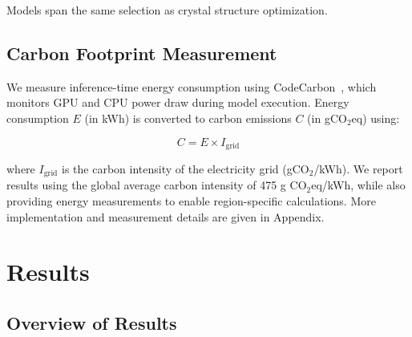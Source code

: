\documentclass{article}
\theoremstyle{plain}
\theoremstyle{definition}
\theoremstyle{remark}
\begin{document}
Models span the same selection as crystal structure optimization.

\subsection{Carbon Footprint Measurement}

We measure inference-time energy consumption using CodeCarbon~\cite{codecarbon}, which monitors GPU and CPU power draw during model execution. Energy consumption $E$ (in kWh) is converted to carbon emissions $C$ (in gCO$_2$eq) using:

\begin{equation}
    C = E \times I_{\text{grid}}
\end{equation}

where $I_{\text{grid}}$ is the carbon intensity of the electricity grid (gCO$_2$/kWh). We report results using the global average carbon intensity of 475 g CO$_2$eq/kWh, while also providing energy measurements to enable region-specific calculations. More implementation and measurement details are given in Appendix.

\section{Results}

\subsection{Overview of Results}
\end{document}
